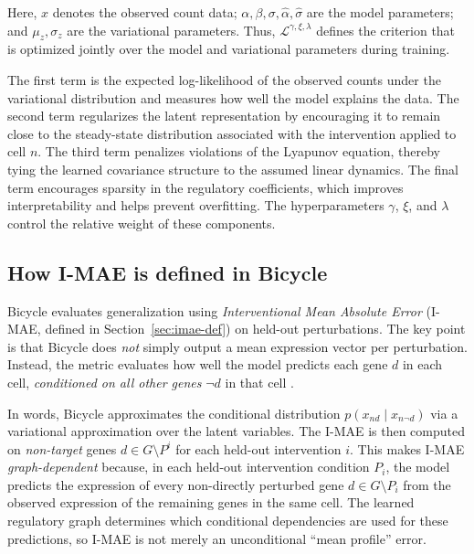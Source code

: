 \documentclass[12pt]{article}
\begin{document}
\vspace*{2cm}

Here, \(x\) denotes the observed count data; \(\alpha,\beta,\sigma,\hat{\alpha},\hat{\sigma}\) are
the model parameters; and \(\mu_z,\sigma_z\) are the variational parameters. Thus,
\(\mathcal{L}^{\gamma,\xi,\lambda}\) defines the criterion that is optimized jointly over the model and
variational parameters during training.

The first term is the expected log-likelihood of the observed counts under the variational
distribution and measures how well the model explains the data. The second term regularizes the
latent representation by encouraging it to remain close to the steady-state distribution associated
with the intervention applied to cell \(n\). The third term penalizes violations of the Lyapunov
equation, thereby tying the learned covariance structure to the assumed linear dynamics. The final
term encourages sparsity in the regulatory coefficients, which improves interpretability and helps
prevent overfitting. The hyperparameters \(\gamma\), \(\xi\), and \(\lambda\) control the relative weight of
these components. 

\subsection{How I-MAE is defined in Bicycle}
\label{sec:imae-graph}
Bicycle evaluates generalization using \emph{Interventional Mean Absolute Error} (I-MAE, defined in Section~\ref{sec:imae-def}) on held-out perturbations. The key point is
that Bicycle does \emph{not} simply output a mean expression vector per perturbation. Instead, the
metric evaluates how well the model predicts each gene \(d\) in each cell, \emph{conditioned on all
other genes} \(\neg d\) in that cell \cite{rohbeck2024bicycle}.

In words, Bicycle approximates the conditional distribution \(p(x_{nd} \mid x_{n\neg d})\) via a
variational approximation over the latent variables. The I-MAE is then computed on \emph{non-target}
genes \(d \in G\setminus P^i\) for each held-out intervention \(i\). This makes I-MAE \emph{graph-dependent} because, in each held-out intervention condition \(P_i\), the model predicts the expression of every non-directly perturbed gene \(d \in G \setminus P_i\) from the observed expression of the remaining genes in the same cell. The learned regulatory graph determines which conditional dependencies are used for these predictions, so I-MAE is not merely an unconditional ``mean profile'' error.
\end{document}
